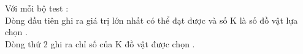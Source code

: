 Với mỗi bộ test :
\\Dòng đầu tiên ghi ra giá trị lớn nhất có thể đạt được và số K là số đồ vật lựa chọn .
\\Dòng thứ 2 ghi ra chỉ số của K đồ vật được chọn .

\